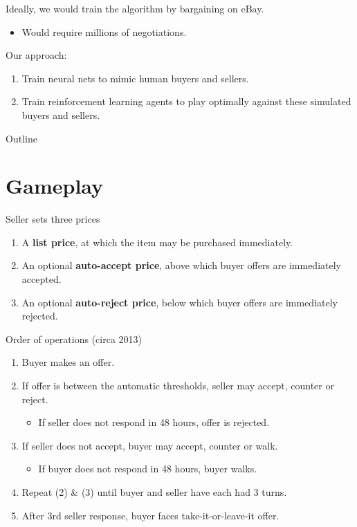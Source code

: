 \documentclass[aspectratio=169]{beamer}
\begin{document}
\begin{frame}
	Ideally, we would train the algorithm by bargaining on eBay.
	\begin{itemize}
		\item Would require millions of negotiations.
	\end{itemize}\pause
	\vspace{5mm}
	Our approach:
	\begin{enumerate}
		\item Train neural nets to mimic human buyers and sellers.
		\item Train reinforcement learning agents to play optimally against these simulated buyers and sellers.
	\end{enumerate}
\end{frame}

\begin{frame}{Outline}\tableofcontents\end{frame}

\section{Gameplay}

\begin{frame}{Seller sets three prices}
	\begin{enumerate}
		\item A \textbf{list price}, at which the item may be purchased immediately.
		\item An optional \textbf{auto-accept price}, above which buyer offers are immediately accepted.
		\item An optional \textbf{auto-reject price}, below which buyer offers are immediately rejected.
	\end{enumerate}
\end{frame}

\begin{frame}{Order of operations (circa 2013)}
	\begin{enumerate}
		\item Buyer makes an offer.\pause
		\item If offer is between the automatic thresholds, seller may accept, counter or reject.
		\begin{itemize}
			\item If seller does not respond in 48 hours, offer is rejected.
		\end{itemize}\pause
		\item If seller does not accept, buyer may accept, counter or walk.
		\begin{itemize}
			\item If buyer does not respond in 48 hours, buyer walks.
		\end{itemize}\pause
		\item Repeat (2) \& (3) until buyer and seller have each had 3 turns.\pause
		\item After 3rd seller response, buyer faces take-it-or-leave-it offer.
	\end{enumerate}
\end{frame}
\end{document}
